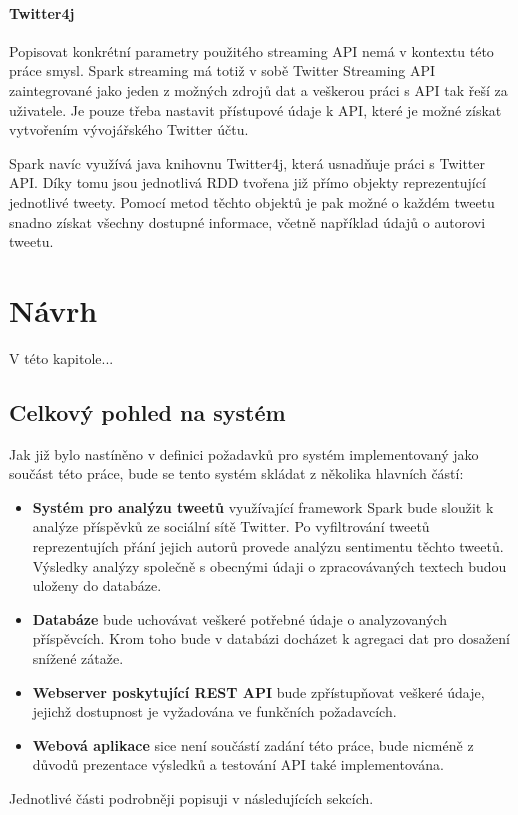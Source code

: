 \documentclass[thesis=B,czech]{FITthesis}[2012/06/26]
\begin{document}
\subsubsection{Twitter4j}
	Popisovat konkrétní parametry použitého streaming API nemá v kontextu této práce smysl. Spark streaming má totiž v sobě Twitter Streaming API zaintegrované jako jeden z možných zdrojů dat a veškerou práci s API tak řeší za uživatele. Je pouze třeba nastavit přístupové údaje k API, které je možné získat vytvořením vývojářského Twitter účtu. 
	
	Spark navíc využívá java knihovnu Twitter4j\cite{twitter4j}, která usnadňuje práci s Twitter API. Díky tomu jsou jednotlivá RDD tvořena již přímo objekty reprezentující jednotlivé tweety. Pomocí metod těchto objektů je pak možné o každém tweetu snadno získat všechny dostupné informace, včetně například údajů o autorovi tweetu. 


\chapter{Návrh}
\label{navrh}
V této kapitole...
\section{Celkový pohled na systém}
Jak již bylo nastíněno v definici požadavků pro systém implementovaný jako součást této práce, bude se tento systém skládat z několika hlavních částí: 
\begin{itemize}
\item \textbf{Systém pro analýzu tweetů} využívající framework Spark bude sloužit k analýze příspěvků ze sociální sítě Twitter. Po vyfiltrování tweetů reprezentujích přání jejich autorů provede analýzu sentimentu těchto tweetů. Výsledky analýzy společně s obecnými údaji o zpracovávaných textech budou uloženy do databáze. 
\item \textbf{Databáze} bude uchovávat veškeré potřebné údaje o analyzovaných příspěvcích. Krom toho bude v databázi docházet k agregaci dat pro dosažení snížené zátaže. 
\item \textbf{Webserver poskytující REST API} bude zpřístupňovat veškeré údaje, jejichž dostupnost je vyžadována ve funkčních požadavcích. 
\item \textbf{Webová aplikace} sice není součástí zadání této práce, bude nicméně z důvodů prezentace výsledků a testování API také implementována. 
\end{itemize}

\noindent Jednotlivé části podrobněji popisuji v následujících sekcích. 
\end{document}
